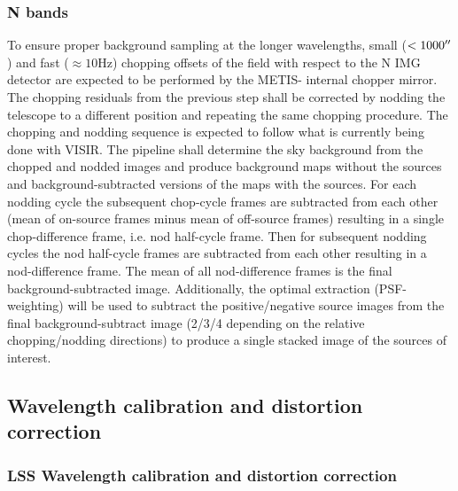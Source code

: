 \subsubsection{N bands}
To ensure proper background sampling at the longer wavelengths, small ($< 1000 \hbox{$^{\prime\prime}$}$) and fast ($\approx 10 \mathrm{Hz}$) chopping offsets of the field with respect to the N IMG detector are expected to be performed by the METIS- internal chopper mirror.
The chopping residuals from the previous step shall be corrected by nodding the telescope to a different position and repeating the same chopping procedure.
The chopping and nodding sequence is expected to follow what is currently being done with VISIR.
The pipeline shall determine the sky background from the chopped and nodded images and produce background maps without the sources and background-subtracted versions of the maps with the sources.
For each nodding cycle the subsequent chop-cycle frames are subtracted from each other (mean of on-source frames minus mean of off-source frames) resulting in a single chop-difference frame, i.e. nod half-cycle frame.
Then for subsequent nodding cycles the nod half-cycle frames are subtracted from each other resulting in a nod-difference frame.
The mean of all nod-difference frames is the final background-subtracted image.
Additionally, the optimal extraction (PSF-weighting) will be used to subtract the positive/negative source images from the final background-subtract image (2/3/4 depending on the relative chopping/nodding directions) to produce a single stacked image of the sources of interest.

\subsection{Wavelength calibration and distortion correction}\label{ssec:criticalwavelengthanddistortion}
\subsubsection{LSS Wavelength calibration and distortion correction}\label{ssec:criticalwavelengthanddistortionlss}

